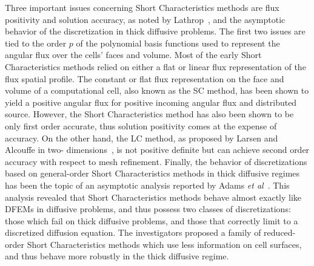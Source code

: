 Three important issues concerning Short Characteristics methods are flux positivity and solution accuracy, as noted by Lathrop~\cite{Lathrop1969}, and the asymptotic behavior of the discretization in thick diffusive problems.
The first two  issues are tied to the order $p$ of the polynomial basis functions used to represent the angular flux over the cells' faces and volume.
Most of the early Short Characteristics methods relied on either a flat or linear flux representation of the flux spatial profile.
The constant or flat flux representation on the face and volume of a computational cell, also known as the \ac{SC} method, has been shown to yield a positive angular flux for positive incoming angular flux and distributed source.
However, the Short Characteristics method has also been shown to be only first order accurate, thus solution positivity comes at the expense of accuracy.
On the other hand, the \ac{LC} method, as proposed by Larsen and Alcouffe in two- dimensions~\cite{Larsen1981}, is not positive definite but can achieve second order accuracy with respect to mesh refinement.
Finally, the behavior of discretizations based on general-order Short Characteristics methods in thick diffusive regimes has been the topic of an asymptotic analysis reported by Adams \textit{et al}~\cite{Adams1998}.
This analysis revealed that Short Characteristics methods behave almost exactly like \acs{DFEM}s in diffusive problems, and thus possess two classes of discretizations: those which fail on thick diffusive problems, and those that correctly limit to a discretized diffusion equation.
The investigators proposed a family of reduced-order Short Characteristics methods which use less information on cell surfaces, and thus behave more robustly in the thick diffusive regime.

